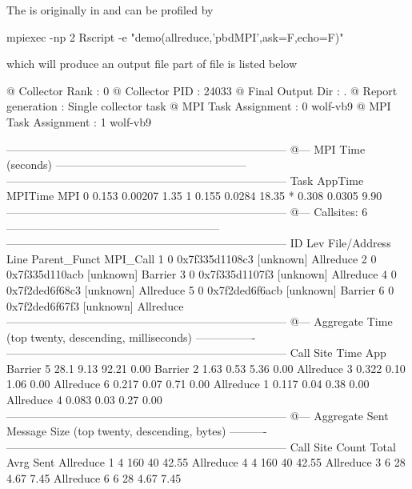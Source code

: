 The  is originally in  and can be profiled by
\begin{Code}
mpiexec -np 2 Rscript -e "demo(allreduce,'pbdMPI',ask=F,echo=F)"
\end{Code}
which will produce an output file 
part of file is listed below
\begin{Output}
@ Collector Rank           : 0
@ Collector PID            : 24033
@ Final Output Dir         : .
@ Report generation        : Single collector task
@ MPI Task Assignment      : 0 wolf-vb9
@ MPI Task Assignment      : 1 wolf-vb9

---------------------------------------------------------------------------
@--- MPI Time (seconds) ---------------------------------------------------
---------------------------------------------------------------------------
Task   AppTime   MPITime    MPI%
0      0.153     0.00207    1.35
1      0.155     0.0284    18.35
*      0.308     0.0305     9.90
---------------------------------------------------------------------------
@--- Callsites: 6 ---------------------------------------------------------
---------------------------------------------------------------------------
ID Lev File/Address        Line Parent_Funct             MPI_Call
1   0 0x7f335d1108c3           [unknown]                Allreduce
2   0 0x7f335d110acb           [unknown]                Barrier
3   0 0x7f335d1107f3           [unknown]                Allreduce
4   0 0x7f2ded6f68c3           [unknown]                Allreduce
5   0 0x7f2ded6f6acb           [unknown]                Barrier
6   0 0x7f2ded6f67f3           [unknown]                Allreduce
---------------------------------------------------------------------------
@--- Aggregate Time (top twenty, descending, milliseconds) ----------------
---------------------------------------------------------------------------
Call                 Site       Time    App%
Barrier                 5       28.1    9.13   92.21    0.00
Barrier                 2       1.63    0.53    5.36    0.00
Allreduce               3      0.322    0.10    1.06    0.00
Allreduce               6      0.217    0.07    0.71    0.00
Allreduce               1      0.117    0.04    0.38    0.00
Allreduce               4      0.083    0.03    0.27    0.00
---------------------------------------------------------------------------
@--- Aggregate Sent Message Size (top twenty, descending, bytes) ----------
---------------------------------------------------------------------------
Call                 Site      Count      Total       Avrg  Sent%
Allreduce               1          4        160         40  42.55
Allreduce               4          4        160         40  42.55
Allreduce               3          6         28       4.67   7.45
Allreduce               6          6         28       4.67   7.45
\end{Output}


